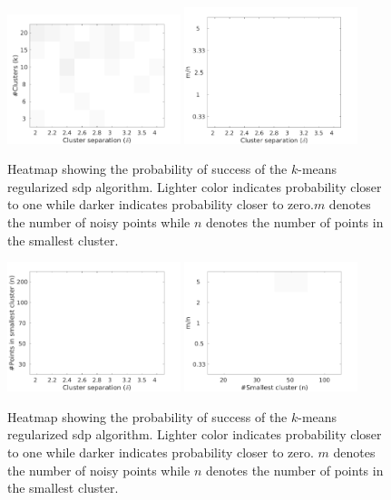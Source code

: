 \documentclass[12pt]{article}
\begin{document}
\begin{figure}
  \includegraphics[width=0.45\textwidth]{figures/optimizationClustering/deltaK.png}
  \includegraphics[width=0.45\textwidth]{figures/optimizationClustering/deltaM.png}
  \caption{Heatmap showing the probability of success of the $k$-means regularized sdp algorithm. Lighter color indicates probability closer to one while darker indicates probability closer to zero.$m$ denotes the number of noisy points while $n$ denotes the number of points in the smallest cluster.}
  \label{a-figure:simulationSepK}
\end{figure}
\begin{figure}
  \includegraphics[width=0.45\textwidth]{figures/optimizationClustering/deltan.png}
  \includegraphics[width=0.45\textwidth]{figures/optimizationClustering/nM.png}
  \caption{Heatmap showing the probability of success of the $k$-means regularized sdp algorithm. Lighter color indicates probability closer to one while darker indicates probability closer to zero. $m$ denotes the number of noisy points while $n$ denotes the number of points in the smallest cluster.}  
  \label{a-figure:simulationSepN}
\end{figure}
\end{document}
